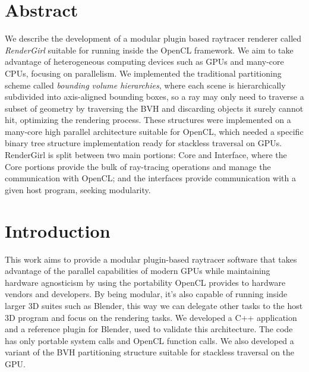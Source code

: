 \documentclass[a0,portrait]{a0poster}
\begin{document}
\begin{multicols}{2} %



\color{Navy} %

\section*{Abstract}
\large

We describe the development of a modular plugin based raytracer
renderer called \emph{RenderGirl} suitable for running inside the
OpenCL framework. We aim to take advantage of heterogeneous computing
devices such as GPUs and many-core CPUs, focusing on parallelism. We
implemented the traditional partitioning scheme called \emph{bounding
  volume hierarchies}, where each scene is hierarchically subdivided
into axis-aligned bounding boxes, so a ray may only need to traverse a
subset of geometry by traversing the BVH and discarding objects it
surely cannot hit, optimizing the rendering process. These structures
were implemented on a many-core high parallel architecture suitable
for OpenCL, which needed a specific binary tree structure
implementation ready for stackless traversal on GPUs. RenderGirl is
split between two main portions: Core and Interface, where the Core
portions provide the bulk of ray-tracing operations and manage the
communication with OpenCL; and the interfaces provide communication
with a given host program, seeking modularity.


\color{Black} %
\normalsize
\section*{Introduction}

This work aims to provide a modular plugin-based raytracer software
that takes advantage of the parallel capabilities of modern GPUs while
maintaining hardware agnosticism by using the portability OpenCL
provides to hardware vendors and developers. By being modular, it's
also capable of running inside larger 3D suites such as Blender, this
way we can delegate other tasks to the host 3D program and focus on
the rendering tasks. We developed a C++ application and a reference
plugin for Blender, used to validate this architecture. The code has
only portable system calls and OpenCL function calls. We also
developed a variant of the BVH partitioning structure suitable for
stackless traversal on the GPU.


\end{multicols}
\end{document}
